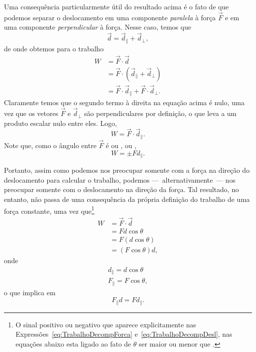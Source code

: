 Uma consequência particularmente útil do resultado acima é o fato de que podemos separar o deslocamento em uma componente \emph{paralela} à força $\vec{F}$ e em uma componente \emph{perpendicular} à força. Nesse caso, temos que
\begin{equation}
    \vec{d} = \vec{d}_{\parallel} + \vec{d}_{\perp},
\end{equation}
%
de onde obtemos para o trabalho
\begin{align}
    W &= \vec{F}\cdot\vec{d} \\
    &= \vec{F}\cdot(\vec{d}_{\parallel} + \vec{d}_{\perp}) \\
    &= \vec{F}\cdot\vec{d}_{\parallel} + \vec{F}\cdot\vec{d}_{\perp}.
\end{align}
%
Claramente temos que o segundo termo à direita na equação acima é nulo, uma vez que os vetores $\vec{F}$ e $\vec{d}_{\perp}$ são perpendiculares por definição, o que leva a um produto escalar nulo entre eles. Logo,
\begin{equation}
    W = \vec{F}\cdot\vec{d}_{\parallel}.
\end{equation}
%
Note que, como o ângulo entre $\vec{F}$ é ou , ou , 
\begin{equation}\label{eq:TrabalhoDecompDesl}
    W = \pm F d_{\parallel}.
\end{equation}

Portanto, assim como podemos nos preocupar somente com a força na direção do deslocamento para calcular o trabalho, podemos ---~alternativamente~--- nos preocupar somente com o deslocamento na direção da força. Tal resultado, no entanto, não passa de uma consequência da própria definição do trabalho de uma força constante, uma vez que\footnote{O sinal positivo ou negativo que aparece explicitamente nas Expressões~\ref{eq:TrabalhoDecompForca} e~\ref{eq:TrabalhoDecompDesl}, nas equações abaixo esta ligado ao fato de $\theta$ ser maior ou menor que .}
\begin{align}
    W &= \vec{F}\cdot\vec{d} \\
    &= Fd\cos\theta \\
    &= F(d\cos\theta) \\
    &= (F\cos\theta)d,
\end{align}
%
onde
\begin{align}
    d_{\parallel} = d\cos\theta \\
    F_{\parallel} = F\cos\theta,
\end{align}
%
o que implica em
\begin{equation}
    F_{\parallel}d = Fd_{\parallel}.
\end{equation}

